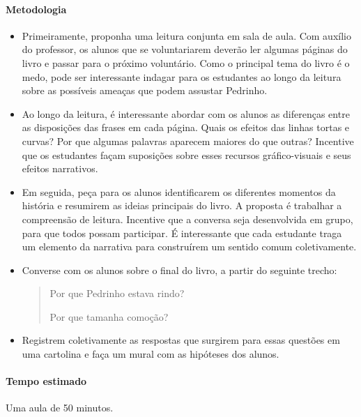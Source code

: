 \documentclass[11pt]{extarticle}
\begin{document}
\pagebreak
\paragraph{Metodologia} 

\begin{itemize}

\item Primeiramente, proponha uma leitura conjunta em sala de aula. Com auxílio do professor, os alunos que se voluntariarem deverão ler algumas páginas do livro e passar para o próximo voluntário. Como o principal tema do livro é o medo, pode ser interessante indagar para os estudantes ao longo da leitura sobre as possíveis ameaças que podem assustar Pedrinho.

\item Ao longo da leitura, é interessante abordar com os alunos as diferenças entre as disposições das frases em cada página. Quais os efeitos das linhas tortas e curvas? Por que algumas palavras aparecem maiores do que outras? Incentive que os estudantes façam suposições sobre esses recursos gráfico-visuais e seus efeitos narrativos.


\item Em seguida, peça para os alunos identificarem os diferentes momentos da história e resumirem as ideias principais do livro. A proposta é trabalhar a compreensão de leitura. Incentive que a conversa seja desenvolvida em grupo, para que todos possam participar. É interessante que cada estudante traga um elemento da narrativa para construírem um sentido comum coletivamente.

\item Converse com os alunos sobre o final do livro, a partir do seguinte trecho:

\begin{quote} {Por que Pedrinho estava rindo? 

Por que tamanha comoção?}
\end{quote}

\item Registrem coletivamente as respostas que surgirem para essas questões em uma cartolina e faça um mural com as hipóteses dos alunos.

\end{itemize}



\paragraph{Tempo estimado} Uma aula de 50 minutos.
\end{document}
